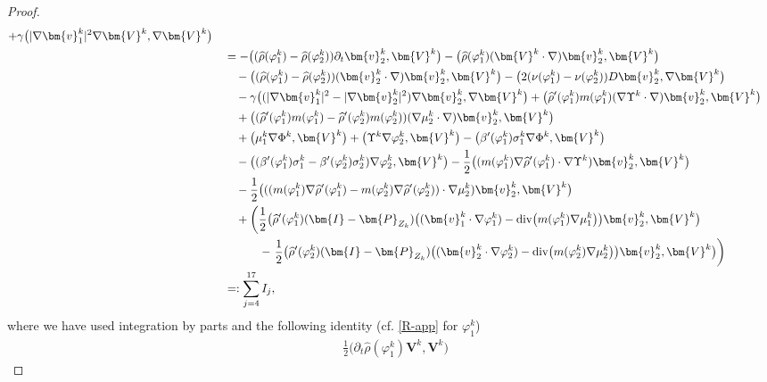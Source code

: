 \documentclass[11pt,reqno]{amsart}
\def\div{\mathrm{div}}
\def\vv{\bm{v}}
\begin{document}
\begin{proof}
\begin{align}
+\gamma\big(|\nabla \bm{v}^k_1|^2\nabla \bm{V}^k, \nabla\bm{V}^k\big)
\notag \\
&\quad =
- \big((\widehat{\rho}(\varphi_1^k)-\widehat{\rho}(\varphi_2^k))\partial_t \bm{v}_2^k,\bm{V}^k\big)
-\big(\widehat{\rho}(\varphi_1^k)( \bm{V}^k \cdot \nabla)  \bm{v}_2^k,\bm{V}^k\big)
\notag \\
&\qquad
-\big((\widehat{\rho}(\varphi_1^k)-\widehat{\rho}(\varphi_2^k))( \bm{v}_2^k \cdot \nabla)  \bm{v}_2^k,\bm{V}^k\big)
-\big(2(\nu(\varphi^{k}_1)-\nu(\varphi^{k}_2)) D\bm{v}_2^k, \nabla \bm{V}^k\big)
\notag \\
&\qquad
-\gamma\big((|\nabla \bm{v}^k_1|^2-|\nabla \bm{v}^k_2|^2)\nabla \vv^k_2, \nabla\bm{V}^k\big)
+ \big(\widehat{\rho}'(\varphi_1^k) m(\varphi_1^k) (\nabla \Upsilon^k \cdot\nabla) \vv_2^k,\bm{V}^k\big)
\notag\\
&\qquad
+ \big((\widehat{\rho}'(\varphi_1^k) m(\varphi_1^k) -\widehat{\rho}'(\varphi_2^k) m(\varphi_2^k)) (\nabla \mu_2^k \cdot\nabla) \vv_2^k,\bm{V}^k\big)
\notag \\
&\qquad
+ \big(\mu_1^k \nabla \Phi^k, \bm{V}^k\big)
+ \big(\Upsilon^k \nabla \varphi_2^k, \bm{V}^k\big)
-\big(\beta'(\varphi_1^k)\sigma_1^k\nabla \Phi^k, \bm{V}^k\big)
\notag\\
&\qquad
-\big((\beta'(\varphi_1^k)\sigma_1^k-\beta'(\varphi_2^k)\sigma_2^k)\nabla \varphi^k_2, \bm{V}^k\big)
- \frac12 \big( (m(\varphi^k_1)\nabla \widehat{\rho}'(\varphi^k_1)\cdot \nabla \Upsilon^k) \vv^k_2,\bm{V}^k\big)
  \notag \\
&\qquad
- \frac12 \big( ((m(\varphi^k_1)\nabla \widehat{\rho}'(\varphi^k_1)-m(\varphi^k_2)\nabla \widehat{\rho}'(\varphi^k_2))\cdot \nabla \mu^k_2) \vv^k_2,\bm{V}^k\big)
 \notag \\
 &\qquad + \left(\frac12\big(\widehat{\rho}'(\varphi^k_1)(\bm{I}-\bm{P}_{Z_{k}}) \big((\bm{v}_1^k\cdot\nabla\varphi^k_1)-\div \big(m(\varphi^k_1)\nabla \mu^k_1\big)\big)\bm{v}_2^k,\bm{V}^k\big)\right.
 \notag\\
&\qquad\qquad  -\left. \frac12\big(\widehat{\rho}'(\varphi^k_2)(\bm{I}-\bm{P}_{Z_{k}}) \big((\bm{v}^k_2\cdot\nabla\varphi^k_2)-\div \big(m(\varphi^k_2)\nabla \mu^k_2\big)\big)\bm{v}^k_2,\bm{V}^k\big)\right)
\notag\\
&\quad =: \sum_{j=4}^{17}I_j,
\label{diffvm}
\end{align}
%
where we have used integration by parts and the following identity (cf. \eqref{R-app} for $\varphi_1^k$)
%
\begin{align*}
& \frac12 \big(\partial_t \widehat{\rho}(\varphi_1^k)\bm{V}^k,\bm{V}^k\big)

\end{align*}
\end{proof}
\end{document}
